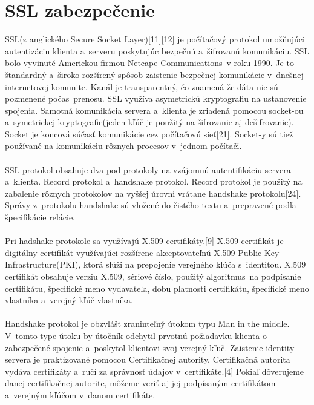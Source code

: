 \documentclass[
  digital, %
  table,   %
oneside,
  nolof,     %
  nolot,     %
]{fithesis3}
\begin{document}
\section{SSL zabezpečenie}
SSL(z anglického Secure Socket Layer)[11][12] je počítačový protokol umožňujúci autentizáciu  klienta a~serveru  poskytujúc  bezpečnú a~šifrovanú komunikáciu. SSL bolo vyvinuté Americkou firmou Netcape Communications~v roku 1990. Je to štandardný a~široko rozšírený spôsob zaistenie bezpečnej komunikácie v~dnešnej internetovej komunite. Kanál je transparentný, čo znamená že dáta nie sú pozmenené počas~prenosu. SSL využíva asymetrickú kryptografiu  na ustanovenie spojenia. Samotná komunikácia servera a~klienta je zriadená pomocou socket-ou a~symetrickej kryptografie(jeden kľúč je použitý na šifrovanie aj dešifrovanie). Socket je koncová súčasť komunikácie cez počítačovú sieť[21]. Socket-y sú tiež používané na komunikáciu rôznych procesov v~jednom počítači. \paragraph{}
SSL protokol obsahuje dva pod-protokoly na vzájomnú autentifikáciu servera a~klienta. Record protokol a~handshake protokol. Record protokol je použitý na zabalenie rôznych protokolov na vyššej úrovni vrátane handshake protokolu[24]. Správy z~protokolu handshake  sú vložené do čistého textu a~prepravené podľa špecifikácie relácie. \paragraph{}
Pri hadshake protokole sa využívajú X.509 certifikáty.[9] X.509 certifikát je digitálny certifikát využívajúci rozšírene akceptovateľnú X.509 Public Key Infrastructure(PKI), ktorá slúži na prepojenie verejného kľúča s~identitou.  X.509 certifikát obsahuje verziu X.509, sériové číslo, použitý algoritmus~na podpísanie certifikátu, špecifické meno vydavateľa, dobu platnosti certifikátu, špecifické meno vlastníka a~verejný kľúč vlastníka.  
\paragraph{}
Handshake protokol je obzvlášť zraninteľný  útokom typu Man in the middle. V~tomto type útoku by útočník odchytil prvotnú požiadavku klienta o zabezpečené spojenie a~poskytol klientovi svoj verejný kľuč. Zaistenie identity servera je praktizované pomocou Certifikačnej autority.  Certifikačná autorita vydáva certifikáty a~ručí za správnosť údajov v~certifikáte.[4] Pokiaľ dôverujeme danej certifikačnej autorite, môžeme veriť aj jej podpísaným certifikátom  a~verejným kľúčom v~danom certifikáte. 
\end{document}
